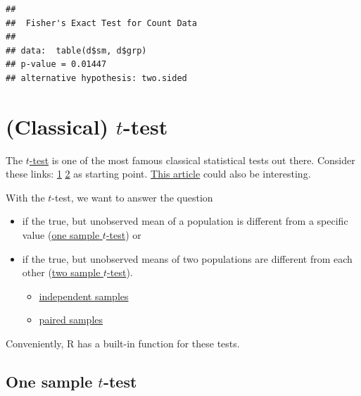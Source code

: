 \documentclass[
]{book}
\providecommand{\tightlist}{%
  \setlength{\itemsep}{0pt}\setlength{\parskip}{0pt}}
\begin{document}
\begin{verbatim}
## 
##  Fisher's Exact Test for Count Data
## 
## data:  table(d$sm, d$grp)
## p-value = 0.01447
## alternative hypothesis: two.sided
\end{verbatim}

\section{\texorpdfstring{(Classical) \(t\)-test}{(Classical) t-test}}\label{classical-t-test}

The \href{https://en.wikipedia.org/wiki/Student\%27s_t-test}{\(t\)-test} is one of the most
famous classical statistical tests out there.
Consider these links: \href{https://www.youtube.com/watch?v=pXuFeRCMTAo&ab_channel=VeryNormal}{1}
\href{https://www.youtube.com/watch?v=pLNuDye_tq4&ab_channel=VeryNormal}{2}
as starting point.
\href{https://www.bmj.com/about-bmj/resources-readers/publications/statistics-square-one/7-t-tests}{This article} could also be interesting.

With the \(t\)-test, we want to answer the question

\begin{itemize}
\item
  if the true, but unobserved mean of a population is different from a
  specific value (\href{https://en.wikipedia.org/wiki/Student\%27s_t-test\#One-sample_t-test}{one sample \(t\)-test}) or
\item
  if the true, but unobserved means of two populations are different from each other (\href{https://en.wikipedia.org/wiki/Student\%27s_t-test\#Two-sample_t-tests}{two sample \(t\)-test}).

  \begin{itemize}
  \tightlist
  \item
    \href{https://en.wikipedia.org/wiki/Student\%27s_t-test\#Independent_two-sample_t-test}{independent samples}
  \item
    \href{https://en.wikipedia.org/wiki/Student\%27s_t-test\#Dependent_t-test_for_paired_samples}{paired samples}
  \end{itemize}
\end{itemize}

Conveniently, R has a built-in function for these tests.

\subsection{\texorpdfstring{One sample \(t\)-test}{One sample t-test}}\label{one-sample-t-test}
\end{document}
